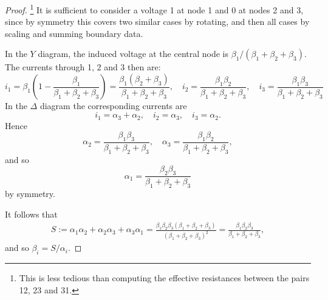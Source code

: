 \documentclass[a4paper]{amsart}
\theoremstyle{plain}
\theoremstyle{definition}
\theoremstyle{remark}
\begin{document}
\begin{proof}%
\footnote{This is less tedious than computing the effective resistances between the pairs 12, 23 and 31.}
It is sufficient to consider a voltage 1 at node 1 and 0 at nodes 2 and 3, since by symmetry this covers  
two similar cases by rotating, and then all cases by scaling and summing boundary data.

In the $ Y $ diagram, the induced voltage at the central node is $ \beta_1/(\beta_1 + \beta_2 + \beta_3) $.
The currents through 1, 2 and 3 then are:
\[
i_1 = \beta_1 \left(1-\frac{\beta_1}{\beta_1 + \beta_2 + \beta_3}\right) =
            \frac{\beta_1(\beta_2+\beta_3)}{\beta_1 + \beta_2 + \beta_3}, \quad 
            i_2 =  \frac{\beta_1\beta_2}{\beta_1 + \beta_2 + \beta_3},\quad 
             i_3=  \frac{\beta_1\beta_3}{\beta_1 + \beta_2 + \beta_3}
\]
In the $ \Delta $ diagram the corresponding currents are
\[
i_1 = \alpha_3 + \alpha_2, \quad i_2 =  \alpha_3 , \quad i_3 = \alpha_2.
\]
Hence 
\[
  \alpha_2 =  \frac{\beta_1\beta_3}{\beta_1 + \beta_2 + \beta_3},\quad 
            \alpha_3=  \frac{\beta_1\beta_2}{\beta_1 + \beta_2 + \beta_3},
                        \]
and so 
\[
  \alpha_1 =  \frac{\beta_2\beta_3}{\beta_1 + \beta_2 + \beta_3}
                          \]
by symmetry. 

 It follows that 
\begin{align*}
S  := \alpha_1 \alpha_2 +  \alpha_2 \alpha_3 +  \alpha_3 \alpha_1 
= \frac{\beta_1\beta_2\beta_3(\beta_1 + \beta_2 + \beta_3)}{(\beta_1 + \beta_2 + \beta_3)^2}
=  \frac{\beta_1\beta_2\beta_3}{ \beta_1 + \beta_2 + \beta_3  },
\end{align*} 
and so $ \beta_i = S/ \alpha_i $.
\end{proof}
   
\end{document}
